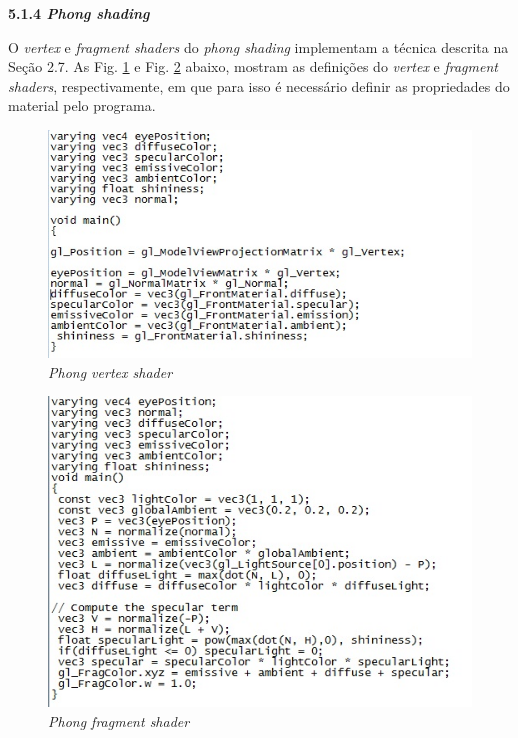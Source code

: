 \begin{description}
	\item \textbf{5.1.4 \textit{Phong shading}}

	O \textit{vertex} e \textit{fragment shaders} do \textit{phong shading} implementam a técnica descrita na Seção 2.7. As Fig. \ref{phong_vs} e Fig. \ref{phong_fs} abaixo, mostram as definições do \textit{vertex} e \textit{fragment shaders}, respectivamente, em que para isso é necessário definir as propriedades do material pelo programa.  

	\begin{figure}[h]
	\centering
		\includegraphics[keepaspectratio=true,scale=1.0]{figuras/phong_vs.jpg}
	\caption{\textit{Phong vertex shader}}
	\label{phong_vs}
	\end{figure}

	\begin{figure}[h]
	\centering
		\includegraphics[keepaspectratio=true,scale=1.0]{figuras/phong_fs.jpg}
	\caption{\textit{Phong fragment shader}}
	\label{phong_fs}
	\end{figure}


\end{description}
